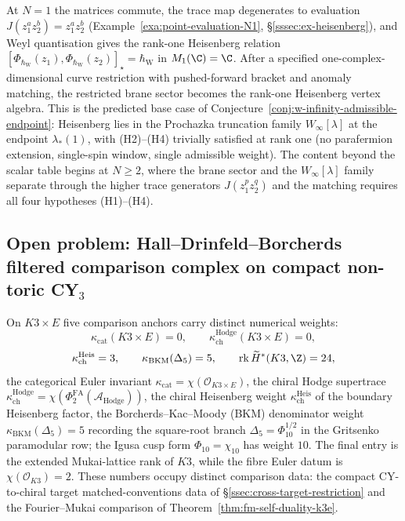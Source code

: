 \begin{rmk}[Base-case consistency of
Conjecture~\ref{conj:w-infinity-admissible-endpoint} at \(N=1\)]
\label{rmk:w-infinity-N1-consistency}
At \(N=1\) the matrices commute, the trace map degenerates to evaluation
\(J(z_1^az_2^b)=z_1^az_2^b\)
(Example~\ref{exa:point-evaluation-N1},
\S\ref{sssec:ex-heisenberg}), and Weyl quantisation gives the rank-one
Heisenberg relation
\([\Phi_{\hbar_{\mathrm{W}}}(z_1),\Phi_{\hbar_{\mathrm{W}}}(z_2)]_\star=\hbar_{\mathrm{W}}\) in
\(M_1(\C)=\C\).  After a specified one-complex-dimensional curve
restriction with pushed-forward bracket and anomaly matching, the
restricted brane sector becomes the rank-one Heisenberg vertex algebra.
This is the predicted base case of
Conjecture~\ref{conj:w-infinity-admissible-endpoint}: Heisenberg lies
in the Prochazka truncation family \(W_\infty[\lambda]\) at the
endpoint \(\lambda_*(1)\), with (H2)--(H4) trivially satisfied at rank
one (no parafermion extension, single-spin window, single admissible
weight).  The content beyond the scalar table begins at \(N\geq 2\),
where the brane sector and the \(W_\infty[\lambda]\) family separate
through the higher trace generators \(J(z_1^pz_2^q)\) and the matching
requires all four hypotheses (H1)--(H4).
\end{rmk}

\subsection{\texorpdfstring{Open problem: Hall--Drinfeld--Borcherds filtered comparison complex on compact non-toric CY$_3$}{Open problem: Hall-Drinfeld-Borcherds filtered comparison complex on compact non-toric CY3}}\label{ssec:open-hall-drinfeld-borcherds}

On $K3\times E$ five comparison anchors carry distinct numerical
weights:
\[
  \kappa_{\mathrm{cat}}(K3\times E)=0,\qquad
  \kappa^{\mathrm{Hodge}}_{\mathrm{ch}}(K3\times E)=0,
\]
\[
  \kappa^{\mathrm{Heis}}_{\mathrm{ch}}=3,\qquad
  \kappa_{\mathrm{BKM}}(\Delta_5)=5,\qquad
  \mathrm{rk}\,\widetilde H^*(K3,\Z)=24,
\]
the categorical Euler invariant
$\kappa_{\mathrm{cat}}=\chi(\mathcal O_{K3\times E})$, the chiral
Hodge supertrace
$\kappa^{\mathrm{Hodge}}_{\mathrm{ch}}=\chi(\Phi^{\mathrm{FA}}_2(\mathcal A_{\mathrm{Hodge}}))$,
the chiral Heisenberg weight
$\kappa^{\mathrm{Heis}}_{\mathrm{ch}}$ of the boundary Heisenberg
factor, the Borcherds--Kac--Moody (BKM) denominator weight
$\kappa_{\mathrm{BKM}}(\Delta_5)=5$ recording the square-root branch
$\Delta_5=\Phi_{10}^{1/2}$ in the Gritsenko paramodular row; the Igusa
cusp form $\Phi_{10}=\chi_{10}$ has weight \(10\).  The final entry is
the extended Mukai-lattice rank of $K3$, while the fibre Euler datum is
\(\chi(\mathcal O_{K3})=2\).  These numbers occupy distinct comparison
data: the compact CY-to-chiral target
matched-conventions data of \S\ref{ssec:cross-target-restriction} and
the Fourier--Mukai comparison of
Theorem~\ref{thm:fm-self-duality-k3e}.

